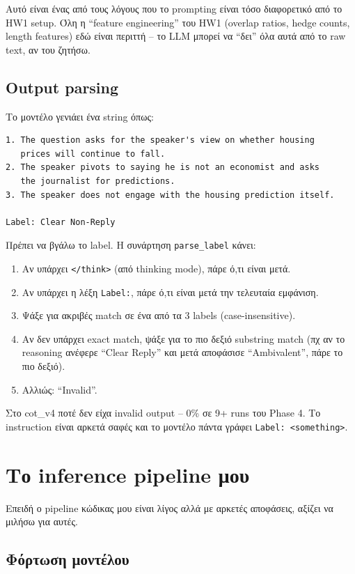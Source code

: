 \documentclass[12pt]{fphw}
\begin{document}
Αυτό είναι ένας από τους λόγους που το prompting είναι τόσο διαφορετικό από το HW1 setup. Όλη η ``feature engineering'' του HW1 (overlap ratios, hedge counts, length features) εδώ είναι περιττή -- το LLM μπορεί να ``δει'' όλα αυτά από το raw text, αν του ζητήσω.

\subsection{Output parsing}

Το μοντέλο γενιάει ένα string όπως:

\begin{verbatim}
1. The question asks for the speaker's view on whether housing
   prices will continue to fall.
2. The speaker pivots to saying he is not an economist and asks
   the journalist for predictions.
3. The speaker does not engage with the housing prediction itself.

Label: Clear Non-Reply
\end{verbatim}

Πρέπει να βγάλω το label. Η συνάρτηση \texttt{parse\_label} κάνει:

\begin{enumerate}
    \item Αν υπάρχει \texttt{</think>} (από thinking mode), πάρε ό,τι είναι μετά.
    \item Αν υπάρχει η λέξη \texttt{Label:}, πάρε ό,τι είναι μετά την τελευταία εμφάνιση.
    \item Ψάξε για ακριβές match σε ένα από τα 3 labels (case-insensitive).
    \item Αν δεν υπάρχει exact match, ψάξε για το πιο δεξιό substring match (πχ αν το reasoning ανέφερε ``Clear Reply'' και μετά αποφάσισε ``Ambivalent'', πάρε το πιο δεξιό).
    \item Αλλιώς: ``Invalid''.
\end{enumerate}

Στο cot\_v4 ποτέ δεν είχα invalid output -- 0\% σε 9+ runs του Phase 4. Το instruction είναι αρκετά σαφές και το μοντέλο πάντα γράφει \texttt{Label: <something>}.

\section{Το inference pipeline μου}

Επειδή ο pipeline κώδικας μου είναι λίγος αλλά με αρκετές αποφάσεις, αξίζει να μιλήσω για αυτές.

\subsection{Φόρτωση μοντέλου}
\end{document}

